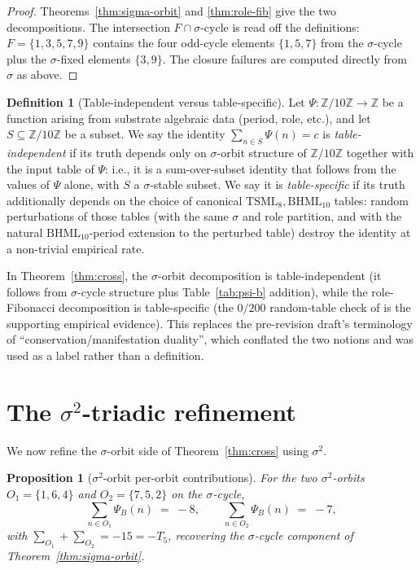 \documentclass[11pt,reqno]{amsart}
\theoremstyle{plain}
\newtheorem{proposition}[theorem]{Proposition}
\theoremstyle{definition}
\newtheorem{definition}[theorem]{Definition}
\theoremstyle{remark}
\newcommand{\Z}{\mathbb{Z}}
\newcommand{\TS}{\mathrm{TSML}}
\newcommand{\BH}{\mathrm{BHML}}
\newcommand{\sig}{\sigma}
\begin{document}
\begin{proof}
Theorems~\ref{thm:sigma-orbit} and \ref{thm:role-fib} give the two
decompositions.  The intersection $F \cap \sig\text{-cycle}$ is read
off the definitions: $F = \{1, 3, 5, 7, 9\}$ contains the four
odd-cycle elements $\{1, 5, 7\}$ from the $\sig$-cycle plus the
$\sig$-fixed elements $\{3, 9\}$.
The closure failures are computed directly from $\sig$ as above.
\end{proof}

\begin{definition}[Table-independent versus table-specific]
\label{def:table-spec}
Let $\Psi : \Z/10\Z \to \Z$ be a function arising from substrate
algebraic data (period, role, etc.), and let $S \subseteq \Z/10\Z$ be
a subset.  We say the identity $\sum_{n \in S} \Psi(n) = c$ is
\emph{table-independent} if its truth depends only on $\sig$-orbit
structure of $\Z/10\Z$ together with the input table of $\Psi$:
i.e., it is a sum-over-subset identity that follows from the values of
$\Psi$ alone, with $S$ a $\sig$-stable subset.
We say it is \emph{table-specific} if its truth additionally depends
on the choice of canonical $\TS_{8}, \BH_{10}$ tables: random
perturbations of those tables (with the same $\sig$ and role partition,
and with the natural $\BH_{10}$-period extension to the perturbed
table) destroy the identity at a non-trivial empirical rate.
\end{definition}

In Theorem~\ref{thm:cross}, the $\sig$-orbit decomposition is
table-independent (it follows from $\sig$-cycle structure plus
Table~\ref{tab:psi-b} addition), while the role-Fibonacci decomposition
is table-specific (the $0/200$ random-table check of
\cite[N8]{SandersBridgeWP9} is the supporting empirical evidence).
This replaces the pre-revision draft's terminology of
``conservation/manifestation duality'', which conflated the two
notions and was used as a label rather than a definition.

\section{The $\sigma^{2}$-triadic refinement}
\label{sec:sigma-2-triadic}

We now refine the $\sig$-orbit side of Theorem~\ref{thm:cross}
using $\sig^{2}$.

\begin{proposition}[$\sig^{2}$-orbit per-orbit contributions]\label{prop:per-orbit}
For the two $\sig^{2}$-orbits $O_{1} = \{1, 6, 4\}$ and
$O_{2} = \{7, 5, 2\}$ on the $\sig$-cycle,
\[
\sum_{n \in O_{1}} \Psi_{B}(n) \;=\; -8,
\qquad
\sum_{n \in O_{2}} \Psi_{B}(n) \;=\; -7,
\]
with $\sum_{O_1} + \sum_{O_2} = -15 = -T_5$, recovering the
$\sig$-cycle component of Theorem~\ref{thm:sigma-orbit}.
\end{proposition}
\end{document}

